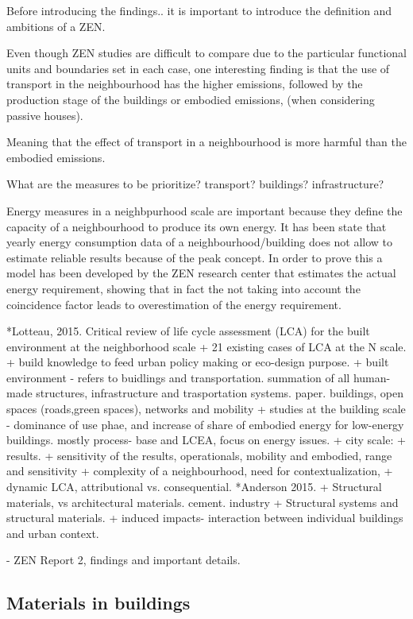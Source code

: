 	Before introducing the findings.. it is important to introduce the definition and ambitions of a ZEN. 


Even though ZEN studies are difficult to compare due to the particular functional units and boundaries set in each case, one interesting finding is that the use of transport in the neighbourhood has the higher emissions, followed by the production stage of the buildings or embodied emissions, (when considering passive houses). 

Meaning that the effect of transport in a neighbourhood is more harmful than the embodied emissions.

What are the measures to be prioritize? transport? buildings? infrastructure?


Energy measures in a neighbpurhood scale are important because they define the capacity of a neighbourhood to produce its own energy. It has been state that yearly energy consumption data of a neighbourhood/building does not allow to estimate reliable results because of the peak concept. In order to prove this a model has been developed by the ZEN research center that estimates the actual energy requirement, showing that in fact the not taking into account the coincidence factor leads to overestimation of the energy requirement.


*Lotteau, 2015.  Critical review of life cycle assessment (LCA) for the built environment at the neighborhood scale
	+ 21 existing cases of LCA at the N scale. 
	+ build knowledge to feed urban policy making or eco-design purpose. 
	+ built environment - refers to buidlings and transportation. summation of all human-made structures, infrastructure and trasportation systems. paper. buildings, open spaces (roads,green spaces), networks and mobility
	+ studies at the building scale - dominance of use phae, and increase of share of embodied energy for low-energy buildings. mostly process- base and LCEA, focus on energy issues. 
	+ city scale: 
	+ results.
	+ sensitivity of the results, operationals, mobility and embodied, range and sensitivity
	+ complexity of a neighbourhood, need for contextualization, 
	+ dynamic LCA, attributional vs. consequential. 
*Anderson 2015. 
	+ Structural materials, vs architectural materials. cement. industry
	+ Structural systems and structural materials. 
	+ induced impacts- interaction between individual buildings and urban context. 

- ZEN Report 2, findings and important details. 

\subsection{Materials in buildings}

